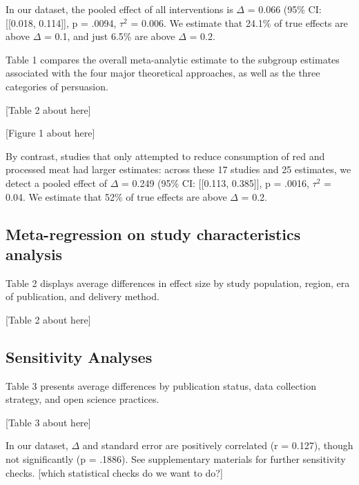 \documentclass[sn-nature,referee,pdflatex]{sn-jnl}
\begin{document}
In our dataset, the pooled effect of all interventions is \(\Delta\) =
0.066 (95\% CI: {[}{[}0.018, 0.114{]}{]}, p = .0094, \(\tau^2\) = 0.006.
We estimate that 24.1\% of true effects are above \(\Delta\) = 0.1, and
just 6.5\% are above \(\Delta\) = 0.2.

Table 1 compares the overall meta-analytic estimate to the subgroup
estimates associated with the four major theoretical approaches, as well
as the three categories of persuasion.

\begin{center}
[Table 2 about here]
\end{center}

\begin{center}
[Figure 1 about here]
\end{center}

By contrast, studies that only attempted to reduce consumption of red
and processed meat had larger estimates: across these 17 studies and 25
estimates, we detect a pooled effect of \(\Delta\) = 0.249 (95\% CI:
{[}{[}0.113, 0.385{]}{]}, p = .0016, \(\tau^2\) = 0.04. We estimate that
52\% of true effects are above \(\Delta\) = 0.2.

\subsection{Meta-regression on study characteristics
analysis}\label{meta-regression-on-study-characteristics-analysis}

Table 2 displays average differences in effect size by study population,
region, era of publication, and delivery method.

\begin{center}
[Table 2 about here]
\end{center}

\subsection{Sensitivity Analyses}\label{sensitivity-analyses}

Table 3 presents average differences by publication status, data
collection strategy, and open science practices.

\begin{center}
[Table 3 about here]
\end{center}

In our dataset, \(\Delta\) and standard error are positively correlated
(r = 0.127), though not significantly (p = .1886). See supplementary
materials for further sensitivity checks. {[}which statistical checks do
we want to do?{]}
\end{document}

